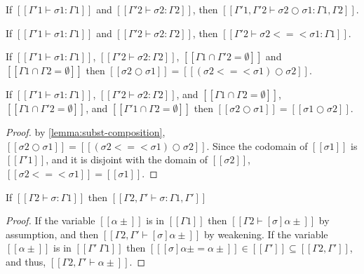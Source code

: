 \begin{lemma}
  If $[[Γ'1 ⊢ σ1 : Γ1]]$ and $[[Γ'2 ⊢ σ2 : Γ2]]$,
  then $[[Γ'1, Γ'2 ⊢ σ2 ○ σ1 : Γ1, Γ2]]$.
\end{lemma}

\begin{lemma}
  \label{lemma:subst-monad-composition-wf}
  If $[[Γ'1 ⊢ σ1 : Γ1]]$ and $[[Γ'2 ⊢ σ2 : Γ2]]$,
  then $[[Γ'2 ⊢ σ2 <=< σ1 : Γ1]]$.
\end{lemma}

\begin{lemma}
  \label{lemma:subst-composition}
    If $[[Γ'1 ⊢ σ1 : Γ1]]$, $[[Γ'2 ⊢ σ2 : Γ2]]$, 
    $[[Γ1 ∩ Γ'2 = ∅ ]]$ and $[[ Γ1 ∩ Γ2 = ∅ ]]$ then 
    $[[ σ2 ○ σ1 ]] = [[ (σ2 <=< σ1) ○ σ2 ]]$.
\end{lemma}

\begin{corollary}
  \label{corollary:subst-composition-commutativity}
  If $[[Γ'1 ⊢ σ1 : Γ1]]$, $[[Γ'2 ⊢ σ2 : Γ2]]$, and
  $[[ Γ1 ∩ Γ2 = ∅ ]]$, 
  $[[ Γ1 ∩ Γ'2 = ∅ ]]$, and
  $[[ Γ'1 ∩ Γ2 = ∅ ]]$ then 
  $[[ σ2 ○ σ1 ]] = [[ σ1 ○ σ2 ]]$.
\end{corollary}
\begin{proof}
  by \cref{lemma:subst-composition},
    $[[ σ2 ○ σ1 ]] = [[ (σ2 <=< σ1) ○ σ2 ]]$.
    Since the codomain of $[[σ1]]$ is $[[Γ'1]]$,
    and it is disjoint with the domain of $[[σ2]]$,
    $[[σ2 <=< σ1]] = [[σ1]]$.
\end{proof}

\begin{lemma}
  \label{lemma:subst-domain-weakening}
  If $[[Γ2 ⊢ σ : Γ1]]$ then $[[Γ2, Γ' ⊢ σ : Γ1, Γ']]$
\end{lemma}
\begin{proof}
  If the variable $[[α±]]$ is in $[[Γ1]]$ then $[[Γ2 ⊢ [σ]α± ]]$ by assumption,
  and then $[[Γ2, Γ' ⊢ [σ]α± ]]$ by weakening.
  If the variable $[[α±]]$ is in $[[Γ' \ Γ1]]$ then $[[ [σ]α± = α± ]] \in [[Γ']] ⊆ [[Γ2, Γ']]$, 
  and thus, $[[Γ2, Γ' ⊢ α± ]]$.
\end{proof}

